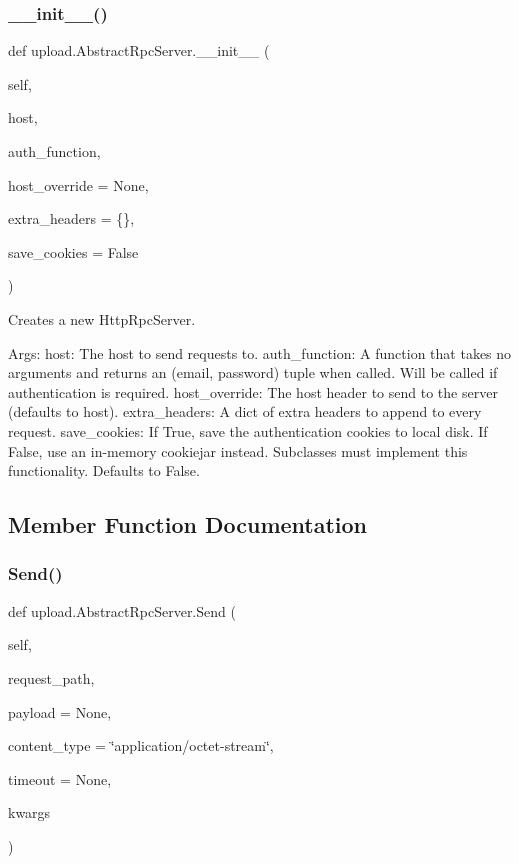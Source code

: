 \subsubsection{\texorpdfstring{\+\_\+\+\_\+init\+\_\+\+\_\+()}{\_\_init\_\_()}}
{\footnotesize\ttfamily def upload.\+Abstract\+Rpc\+Server.\+\_\+\+\_\+init\+\_\+\+\_\+ (\begin{DoxyParamCaption}\item[{}]{self,  }\item[{}]{host,  }\item[{}]{auth\+\_\+function,  }\item[{}]{host\+\_\+override = {\ttfamily None},  }\item[{}]{extra\+\_\+headers = {\ttfamily \{\}},  }\item[{}]{save\+\_\+cookies = {\ttfamily False} }\end{DoxyParamCaption})}

\begin{DoxyVerb}Creates a new HttpRpcServer.

Args:
  host: The host to send requests to.
  auth_function: A function that takes no arguments and returns an
(email, password) tuple when called. Will be called if authentication
is required.
  host_override: The host header to send to the server (defaults to host).
  extra_headers: A dict of extra headers to append to every request.
  save_cookies: If True, save the authentication cookies to local disk.
If False, use an in-memory cookiejar instead.  Subclasses must
implement this functionality.  Defaults to False.
\end{DoxyVerb}
 

\subsection{Member Function Documentation}
\mbox{\label{classupload_1_1_abstract_rpc_server_ac1b913f8bd00da4741c47ab49ea94cb5}} 
\subsubsection{\texorpdfstring{Send()}{Send()}}
{\footnotesize\ttfamily def upload.\+Abstract\+Rpc\+Server.\+Send (\begin{DoxyParamCaption}\item[{}]{self,  }\item[{}]{request\+\_\+path,  }\item[{}]{payload = {\ttfamily None},  }\item[{}]{content\+\_\+type = {\ttfamily \char`\"{}application/octet-\/stream\char`\"{}},  }\item[{}]{timeout = {\ttfamily None},  }\item[{}]{kwargs }\end{DoxyParamCaption})}

